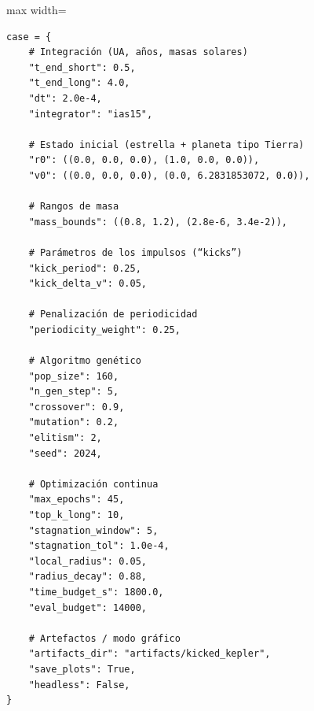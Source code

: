 \begin{listing}[H]
\caption{Declaración del diccionario \texttt{case} en el notebook Caso03}
\label{lst:c03_case} %
\begin{adjustbox}{max width=\textwidth}
\begin{minipage}{\textwidth}
\begin{verbatim}
case = {
    # Integración (UA, años, masas solares)
    "t_end_short": 0.5,
    "t_end_long": 4.0,
    "dt": 2.0e-4,
    "integrator": "ias15",

    # Estado inicial (estrella + planeta tipo Tierra)
    "r0": ((0.0, 0.0, 0.0), (1.0, 0.0, 0.0)),
    "v0": ((0.0, 0.0, 0.0), (0.0, 6.2831853072, 0.0)),

    # Rangos de masa
    "mass_bounds": ((0.8, 1.2), (2.8e-6, 3.4e-2)),

    # Parámetros de los impulsos (“kicks”)
    "kick_period": 0.25,
    "kick_delta_v": 0.05,

    # Penalización de periodicidad
    "periodicity_weight": 0.25,

    # Algoritmo genético
    "pop_size": 160,
    "n_gen_step": 5,
    "crossover": 0.9,
    "mutation": 0.2,
    "elitism": 2,
    "seed": 2024,

    # Optimización continua
    "max_epochs": 45,
    "top_k_long": 10,
    "stagnation_window": 5,
    "stagnation_tol": 1.0e-4,
    "local_radius": 0.05,
    "radius_decay": 0.88,
    "time_budget_s": 1800.0,
    "eval_budget": 14000,

    # Artefactos / modo gráfico
    "artifacts_dir": "artifacts/kicked_kepler",
    "save_plots": True,
    "headless": False,
}
\end{verbatim}
\end{minipage}
\end{adjustbox}
\end{listing}

